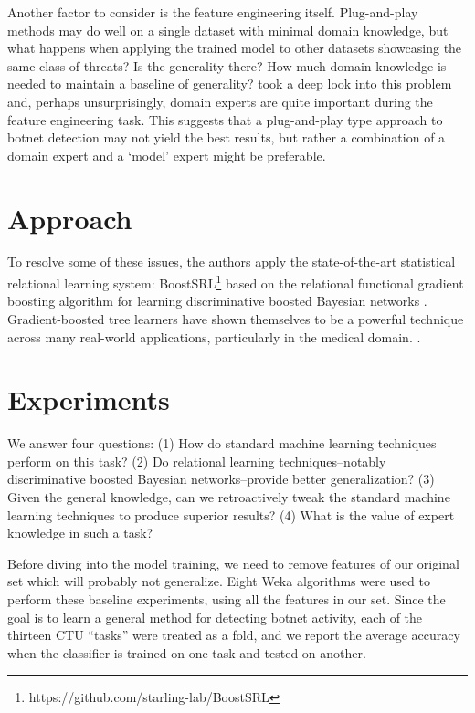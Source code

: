 \documentclass[letterpaper]{article}
\begin{document}
Another factor to consider is the feature engineering itself.  Plug-and-play methods may do well on a single dataset with minimal domain knowledge, but what happens when applying the trained model to other datasets showcasing the same class of threats?  Is the generality there?  How much domain knowledge is needed to maintain a baseline of generality?  \cite{BENASHER201551} took a deep look into this problem and, perhaps unsurprisingly, domain experts are quite important during the feature engineering task.  This suggests that a plug-and-play type approach to botnet detection may not yield the best results, but rather a combination of a domain expert and a `model' expert might be preferable.

\section{Approach}

To resolve some of these issues, the authors apply the state-of-the-art statistical relational learning system: BoostSRL\footnote{https://github.com/starling-lab/BoostSRL} based on the relational functional gradient boosting algorithm \cite{natarajan2015boosted} for learning discriminative boosted Bayesian networks \cite{ramanan2017discriminative}. Gradient-boosted tree learners have shown themselves to be a powerful technique across many real-world applications, particularly in the medical domain.  \cite{yang2017combining}.

\section{Experiments}
We answer four questions: (1) How do standard machine learning techniques perform on this task? (2) Do relational learning techniques--notably discriminative boosted Bayesian networks--provide better generalization? (3) Given the general knowledge, can we retroactively tweak the standard machine learning techniques to produce superior results? (4) What is the value of expert knowledge in such a task?

Before diving into the model training, we need to remove features of our original set which will probably not generalize.  Eight Weka \cite{witten2016data} algorithms were used to perform these baseline experiments, using all the features in our set. Since the goal is to learn a general method for detecting botnet activity, each of the thirteen CTU ``tasks'' were treated as a fold, and we report the average accuracy when the classifier is trained on one task and tested on another.
\end{document}
